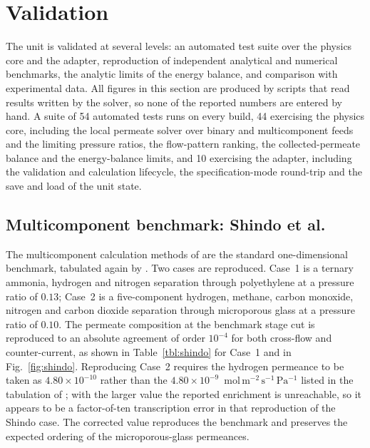 \documentclass[a4paper,fleqn]{cas-dc}
\begin{document}
\section{Validation}\label{sec:validation}
The unit is validated at several levels: an automated test suite over the physics
core and the adapter, reproduction of independent analytical and numerical
benchmarks, the analytic limits of the energy balance, and comparison with
experimental data. All figures in this section are produced by scripts that read
results written by the solver, so none of the reported numbers are entered by
hand. A suite of 54 automated tests runs on every build, 44 exercising the
physics core, including the local permeate solver over binary and multicomponent
feeds and the limiting pressure ratios, the flow-pattern ranking, the
collected-permeate balance and the energy-balance limits, and 10 exercising the
adapter, including the validation and calculation lifecycle, the
specification-mode round-trip and the save and load of the unit state.

\subsection{Multicomponent benchmark: Shindo et al.}\label{sec:val-shindo}
The multicomponent calculation methods of \citet{shindo1985} are the standard
one-dimensional benchmark, tabulated again by \citet{diaspinto2020}. Two cases
are reproduced. Case~1 is a ternary ammonia, hydrogen and nitrogen separation
through polyethylene at a pressure ratio of $0.13$; Case~2 is a five-component
hydrogen, methane, carbon monoxide, nitrogen and carbon dioxide separation
through microporous glass at a pressure ratio of $0.10$. The permeate
composition at the benchmark stage cut is reproduced to an absolute agreement of
order $10^{-4}$ for both cross-flow and counter-current, as shown in
Table~\ref{tbl:shindo} for Case~1 and in Fig.~\ref{fig:shindo}. Reproducing
Case~2 requires the hydrogen permeance to be taken as
$4.80\times10^{-10}$ rather than the
$4.80\times10^{-9}$~$\mathrm{mol\,m^{-2}\,s^{-1}\,Pa^{-1}}$ listed in the
tabulation of \citet{diaspinto2020}; with the larger value the reported
enrichment is unreachable, so it appears to be a factor-of-ten transcription
error in that reproduction of the Shindo case. The corrected value reproduces the
benchmark and preserves the expected ordering of the microporous-glass
permeances.
\end{document}
